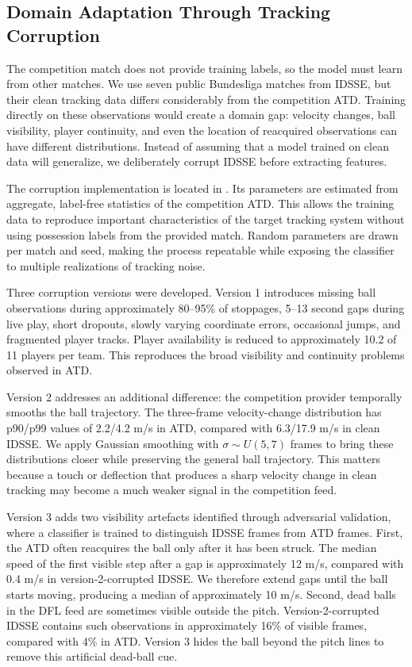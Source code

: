 \documentclass[11pt,a4paper]{article}
\begin{document}
\subsection{Domain Adaptation Through Tracking Corruption}

The competition match does not provide training labels, so the model must learn from other matches. We use seven public Bundesliga matches from IDSSE, but their clean tracking data differs considerably from the competition ATD. Training directly on these observations would create a domain gap: velocity changes, ball visibility, player continuity, and even the location of reacquired observations can have different distributions. Instead of assuming that a model trained on clean data will generalize, we deliberately corrupt IDSSE before extracting features.

The corruption implementation is located in . Its parameters are estimated from aggregate, label-free statistics of the competition ATD. This allows the training data to reproduce important characteristics of the target tracking system without using possession labels from the provided match. Random parameters are drawn per match and seed, making the process repeatable while exposing the classifier to multiple realizations of tracking noise.

Three corruption versions were developed. Version 1 introduces missing ball observations during approximately 80--95\% of stoppages, 5--13 second gaps during live play, short dropouts, slowly varying coordinate errors, occasional jumps, and fragmented player tracks. Player availability is reduced to approximately 10.2 of 11 players per team. This reproduces the broad visibility and continuity problems observed in ATD.

Version 2 addresses an additional difference: the competition provider temporally smooths the ball trajectory. The three-frame velocity-change distribution has p90/p99 values of 2.2/4.2 m/s in ATD, compared with 6.3/17.9 m/s in clean IDSSE. We apply Gaussian smoothing with \(\sigma \sim U(5,7)\) frames to bring these distributions closer while preserving the general ball trajectory. This matters because a touch or deflection that produces a sharp velocity change in clean tracking may become a much weaker signal in the competition feed.

Version 3 adds two visibility artefacts identified through adversarial validation, where a classifier is trained to distinguish IDSSE frames from ATD frames. First, the ATD often reacquires the ball only after it has been struck. The median speed of the first visible step after a gap is approximately 12 m/s, compared with 0.4 m/s in version-2-corrupted IDSSE. We therefore extend gaps until the ball starts moving, producing a median of approximately 10 m/s. Second, dead balls in the DFL feed are sometimes visible outside the pitch. Version-2-corrupted IDSSE contains such observations in approximately 16\% of visible frames, compared with 4\% in ATD. Version 3 hides the ball beyond the pitch lines to remove this artificial dead-ball cue.
\end{document}
